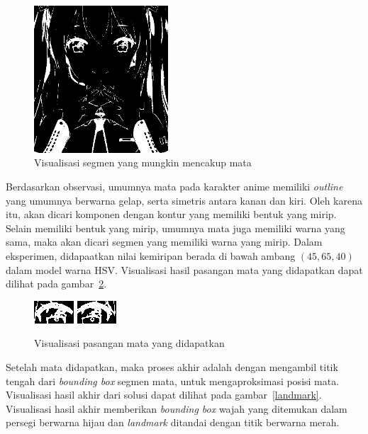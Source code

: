 \documentclass[conference, a4paper]{IEEEtran}
\begin{document}
\begin{figure}[ht]
  \begin{center}
    \includegraphics[width=5cm]{img/process_eye_candidates.jpg}
  \end{center}
  \caption{Visualisasi segmen yang mungkin mencakup mata}\label{eye_cluster}
\end{figure}

Berdasarkan observasi, umumnya mata pada karakter anime memiliki \textit{outline} yang umumnya berwarna gelap, serta simetris antara kanan dan kiri. Oleh karena itu, akan dicari komponen dengan kontur yang memiliki bentuk yang mirip. Selain memiliki bentuk yang mirip, umumnya mata juga memiliki warna yang sama, maka akan dicari segmen yang memiliki warna yang mirip. Dalam eksperimen, didapaatkan nilai kemiripan berada di bawah ambang $(45, 65, 40)$ dalam model warna HSV. Visualisasi hasil pasangan mata yang didapatkan dapat dilihat pada gambar~\ref{eyes}.

\begin{figure}[ht]
  \begin{center}
    \includegraphics{img/eye_candidate_1.jpg}
    \includegraphics{img/eye_candidate_2.jpg}
  \end{center}
  \caption{Visualisasi pasangan mata yang didapatkan}\label{eyes}
\end{figure}

Setelah mata didapatkan, maka proses akhir adalah dengan mengambil titik tengah dari \textit{bounding box} segmen mata, untuk mengaproksimasi posisi mata. Visualisasi hasil akhir dari solusi dapat dilihat pada gambar~\ref{landmark}. Visualisasi hasil akhir memberikan \textit{bounding box} wajah yang ditemukan dalam persegi berwarna hijau dan \textit{landmark} ditandai dengan titik berwarna merah.
\end{document}
